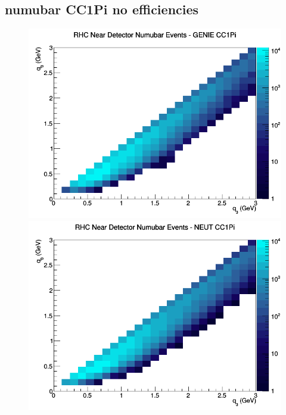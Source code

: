 \documentclass[12pt]{article}
\begin{document}
\subsection{numubar CC1Pi no efficiencies}
\begin{figure}[h]
\includegraphics[width=\linewidth]{q0_q3/nominal/CC1Pi_RHC_ND_numubar_q3_q0_GENIE.png}
\endminipage
{}
\includegraphics[width=\linewidth]{q0_q3/nominal/CC1Pi_RHC_ND_numubar_q3_q0_NEUT.png}
\endminipage
{}

\end{figure}
\end{document}
